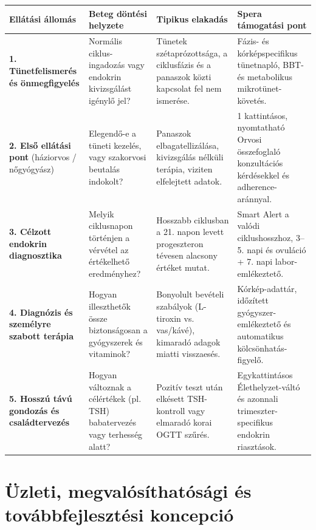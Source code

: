 \documentclass[10pt,a4paper]{article}
\begin{document}
\begin{center}
\small
\renewcommand{\arraystretch}{1.18}
\begin{tabularx}{\linewidth}{@{}p{3.1cm} X X X@{}}
\toprule
\textbf{Ellátási állomás} & \textbf{Beteg döntési helyzete} & \textbf{Tipikus elakadás} & \textbf{Spera támogatási pont} \\
\midrule
\textbf{1. Tünetfelismerés és önmegfigyelés} & Normális ciklus-ingadozás vagy endokrin kivizsgálást igénylő jel? & Tünetek szétaprózottsága, a ciklusfázis és a panaszok közti kapcsolat fel nem ismerése. & Fázis- és kórképspecifikus tünetnapló, BBT- és metabolikus mikrotünet-követés. \\
\textbf{2. Első ellátási pont} (háziorvos / nőgyógyász) & Elegendő-e a tüneti kezelés, vagy szakorvosi beutalás indokolt? & Panaszok elbagatellizálása, kivizsgálás nélküli terápia, viziten elfelejtett adatok. & 1 kattintásos, nyomtatható Orvosi összefoglaló konzultációs kérdésekkel és adherence-aránnyal. \\
\textbf{3. Célzott endokrin diagnosztika} & Melyik ciklusnapon történjen a vérvétel az értékelhető eredményhez? & Hosszabb ciklusban a 21. napon levett progeszteron tévesen alacsony értéket mutat. & Smart Alert a valódi ciklushosszhoz, 3--5. napi és ovuláció + 7. napi labor-emlékeztető. \\
\textbf{4. Diagnózis és személyre szabott terápia} & Hogyan illeszthetők össze biztonságosan a gyógyszerek és vitaminok? & Bonyolult bevételi szabályok (L-tiroxin vs. vas/kávé), kimaradó adagok miatti visszaesés. & Kórkép-adattár, időzített gyógyszer-emlékeztető és automatikus kölcsönhatás-figyelő. \\
\textbf{5. Hosszú távú gondozás és családtervezés} & Hogyan változnak a célértékek (pl. TSH) babatervezés vagy terhesség alatt? & Pozitív teszt után elkésett TSH-kontroll vagy elmaradó korai OGTT szűrés. & Egykattintásos Élethelyzet-váltó és azonnali trimeszter-specifikus endokrin riasztások. \\
\bottomrule
\end{tabularx}
\end{center}

\section{Üzleti, megvalósíthatósági és továbbfejlesztési koncepció}
\end{document}
